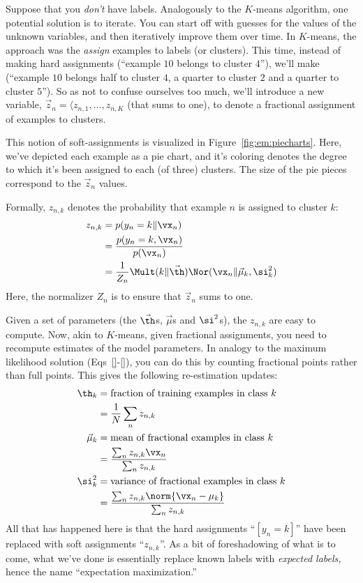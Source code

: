 %
%
Suppose that you \emph{don't} have labels.  Analogously to the
$K$-means algorithm, one potential solution is to iterate.  You can
start off with guesses for the values of the unknown variables, and
then iteratively improve them over time.  In $K$-means, the approach
was the \emph{assign} examples to labels (or clusters).  This time,
instead of making hard assignments (``example $10$ belongs to cluster
$4$''), we'll make  (``example $10$ belongs
half to cluster $4$, a quarter to cluster $2$ and a quarter to cluster
$5$'').  So as not to confuse ourselves too much, we'll introduce a
new variable, $\vec z_n = \langle z_{n,1}, \dots, z_{n,K}$ (that sums
to one), to denote a fractional assignment of examples to clusters.


This notion of soft-assignments is visualized in
Figure~\ref{fig:em:piecharts}.  Here, we've depicted each example as a
pie chart, and it's coloring denotes the degree to which it's been
assigned to each (of three) clusters.  The size of the pie pieces
correspond to the $\vec z_n$ values.

Formally, $z_{n,k}$ denotes the probability that example $n$ is
assigned to cluster $k$:
%
\begin{align}
z_{n,k} &= p(y_n = k \| \vx_n) \\
&= \frac {p(y_n = k, \vx_n)} {p(\vx_n)} \\
&= \frac 1 {Z_n} \Mult(k \| \vec\th) \Nor(\vx_n \| \vec\mu_k, \si^2_k)
\end{align}
%
Here, the normalizer $Z_n$ is to ensure that $\vec z_n$ sums to one.

Given a set of parameters (the $\vec\th$s, $\vec\mu$s and $\si^2$s),
the  $z_{n,k}$ are easy to compute.
Now, akin to $K$-means, given fractional assignments, you need to
recompute estimates of the model parameters.  In analogy to the
maximum likelihood solution (Eqs~\eqref{}-\eqref{}), you can do this
by counting fractional points rather than full points.  This gives the
following re-estimation updates:
%
\begin{align}
\th_k &= \text{fraction of training examples in class $k$} \\
&= \frac 1 N \sum_n z_{n,k} \nonumber\\
\vec\mu_k &= \text{mean of fractional examples in class $k$} \\
&= \frac {\sum_n z_{n,k} \vx_n} {\sum_n z_{n,k}} \nonumber\\
\si^2_k &= \text{variance of fractional examples in class $k$} \\
&= \frac {\sum_n z_{n,k} \norm{\vx_n-\mu_k}} {\sum_n z_{n,k}} \nonumber
\end{align}
%
All that has happened here is that the hard assignments ``$[y_n=k]$''
have been replaced with soft assignments ``$z_{n,k}$''.  As a bit of
foreshadowing of what is to come, what we've done is essentially
replace known labels with \emph{expected labels,} hence the name
``expectation maximization.''


